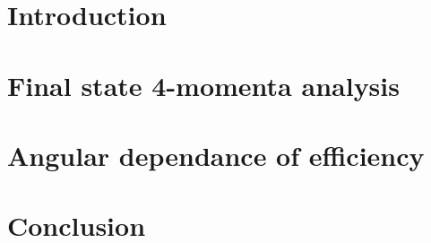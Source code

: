 \newif\iflinenumbers
\linenumberstrue  %









\clearpage


\tableofcontents
\clearpage


\section{Introduction}
\label{SEC:Introduction}



\section{Final state 4-momenta analysis}
\label{SEC:MyProcessor}



\section{Angular dependance of efficiency}
\label{SEC:ApplyingCuts}



\section{Conclusion}
\label{SEC:Conclusion}





